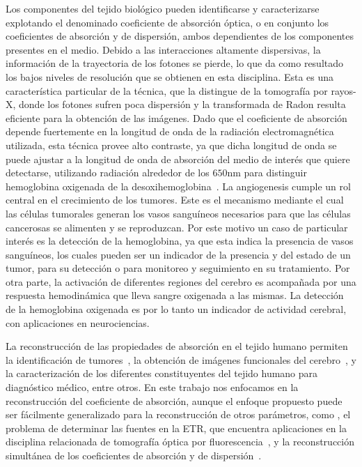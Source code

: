  Los componentes del tejido biológico pueden identificarse y caracterizarse
 explotando el denominado coeficiente de absorción óptica, o en conjunto 
 los coeficientes de absorción y de dispersión, ambos dependientes 
 de los componentes presentes en el medio.
 Debido a las interacciones altamente dispersivas,
 la información de la trayectoria de los fotones se pierde,
 lo que da como resultado los bajos niveles de resolución que se obtienen en esta disciplina. 
 Esta es una característica particular de la técnica, que la distingue de la tomografía 
 por rayos-X, donde los fotones sufren poca dispersión y la transformada de 
Radon resulta eficiente para la obtención de las imágenes. Dado que el coeficiente de absorción depende fuertemente en la longitud de onda 
 de la radiación electromagnética utilizada, esta técnica provee alto contraste, 
 ya que dicha longitud de onda se puede ajustar a la longitud de onda de absorción 
 del medio de interés que quiere detectarse, \eg utilizando radiación alrededor de los $650$nm 
 para distinguir hemoglobina oxigenada de la desoxihemoglobina~\cite{Boas2001}. La angiogenesis 
 cumple un rol central en el crecimiento de los tumores. Este es 
 el mecanismo mediante el cual las células tumorales generan los vasos sanguíneos 
 necesarios para que las células cancerosas se alimenten y se reproduzcan. Por este 
 motivo un caso de particular interés es la detección de la hemoglobina, ya que esta indica la presencia de vasos sanguíneos, los cuales pueden ser un indicador de la presencia y del estado de un tumor, para su detección o para monitoreo y seguimiento en su tratamiento. 
 Por otra parte, 
 la activación de diferentes regiones del cerebro 
 es acompañada por una respuesta hemodinámica que lleva sangre oxigenada 
 a las mismas. La detección de la hemoglobina 
 oxigenada es por lo tanto un indicador de actividad cerebral, con aplicaciones 
 en neurociencias. 
 
 La reconstrucción de las propiedades de absorción en el tejido humano permiten la identificación de tumores~\cite{Zhu2005, Zhu2010, Fujii2016b},
 la obtención de imágenes funcionales del cerebro~\cite{Boas2001, bluestone2001, Arridge1999}, y la caracterización de los diferentes
 constituyentes del tejido humano para diagnóstico médico, entre otros. En este trabajo nos enfocamos en
 la reconstrucción del coeficiente de absorción, aunque
 el enfoque propuesto puede ser fácilmente generalizado para la reconstrucción 
 de otros parámetros, como \eg, el problema de determinar las fuentes en la ETR,
 que encuentra aplicaciones en la disciplina relacionada de
 tomografía óptica por fluorescencia~\cite{Klose2005,Klose2010, Ren2010}, y la reconstrucción 
 simultánea de los coeficientes de absorción y de dispersión~\cite{Ren2006,Prieto2017}.

